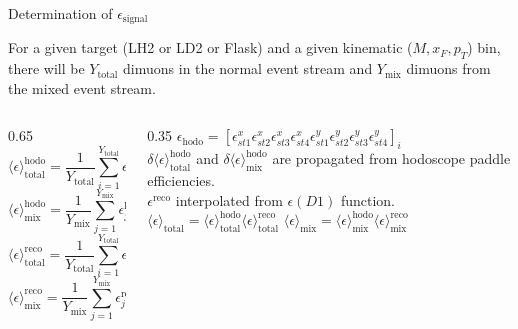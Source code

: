 \documentclass[aspectratio=169]{beamer}
\begin{document}
\begin{frame}{Determination of $\epsilon_{\text{signal}}$}
    
\small
For a given target (LH2 or LD2 or Flask) and a given kinematic ($M, x_F, p_T$) bin, there will be $Y_{\text{total}}$ dimuons in the normal event stream and $Y_{\text{mix}}$ dimuons from the mixed event stream.
\vspace{0.2cm}
\begin{columns}[T]
\begin{column}{0.65\textwidth}
\begin{equation*}
\langle \epsilon \rangle_{\text{total}}^{\text{hodo}} = \frac{1}{Y_{\text{total}}} \sum_{i=1}^{Y_{\text{total}}} \epsilon_i^{\text{hodo}}
\end{equation*}
\begin{equation*}
\langle \epsilon \rangle_{\text{mix}}^{\text{hodo}} = \frac{1}{Y_{\text{mix}}} \sum_{j=1}^{Y_{\text{mix}}} \epsilon_j^{\text{hodo}}
\end{equation*}
\begin{equation*}
\langle \epsilon \rangle_{\text{total}}^{\text{reco}} = \frac{1}{Y_{\text{total}}} \sum_{i=1}^{Y_{\text{total}}} \epsilon_i^{\text{reco}}
\end{equation*}
\begin{equation*}
\langle \epsilon \rangle_{\text{mix}}^{\text{reco}} = \frac{1}{Y_{\text{mix}}} \sum_{j=1}^{Y_{\text{mix}}} \epsilon_j^{\text{reco}}
\end{equation*}
\end{column}
\begin{column}{0.35\textwidth}
\vspace{0.4cm}
\scriptsize
$\epsilon_{\text{hodo}} = [\epsilon_{st1}^x \epsilon_{st2}^x \epsilon_{st3}^x \epsilon_{st4}^x \epsilon_{st1}^y \epsilon_{st2}^y \epsilon_{st3}^y \epsilon_{st4}^y]_i$
\vspace{0.4cm}\\
$\delta\langle\epsilon\rangle_{\text{total}}^{\text{hodo}}$ and $\delta\langle\epsilon\rangle_{\text{mix}}^{\text{hodo}}$ are propagated from hodoscope paddle efficiencies.
\vspace{0.6cm}\\
$\epsilon^{\text{reco}}$ interpolated from $\epsilon(D1)$ function.
\vspace{0.4cm}\\
$\langle \epsilon \rangle_{\text{total}} = \langle \epsilon \rangle_{\text{total}}^{\text{hodo}} \langle \epsilon \rangle_{\text{total}}^{\text{reco}}$ \qquad $\langle \epsilon \rangle_{\text{mix}} = \langle \epsilon \rangle_{\text{mix}}^{\text{hodo}} \langle \epsilon \rangle_{\text{mix}}^{\text{reco}}$

\end{column}
\end{columns}
\end{frame}
\end{document}
